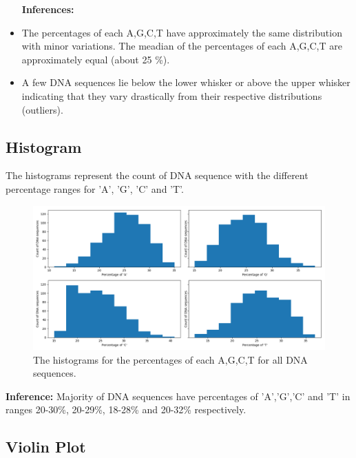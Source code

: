 \documentclass{article}
\begin{document}
			
			\begin{itemize}\itemsep1pt
				\item [\textbf{Inferences:}]
				\item The percentages of each A,G,C,T have approximately the same distribution with minor variations. The meadian of the percentages of each A,G,C,T are approximately equal (about 25 \%).
				\item A few DNA sequences lie below the lower whisker or above the upper whisker indicating that they vary drastically from their respective distributions (outliers).
			\end{itemize}
			
		\subsection{Histogram}
			
			The histograms represent the count of DNA sequence with the different percentage ranges for 'A', 'G', 'C' and 'T'.
			\begin{figure}[!htbp]
				\centering
				\includegraphics[scale=0.4]{charts/Figure_3}
				\caption{The histograms for the percentages of each A,G,C,T for all DNA sequences.}
			\end{figure}
			
			\textbf{Inference:} Majority of DNA sequences have percentages of 'A','G','C' and 'T' in ranges 20-30\%, 20-29\%, 18-28\% and 20-32\% respectively.
		
		\vspace{16pt}	
		
		\subsection{Violin Plot}
		
\end{document}
